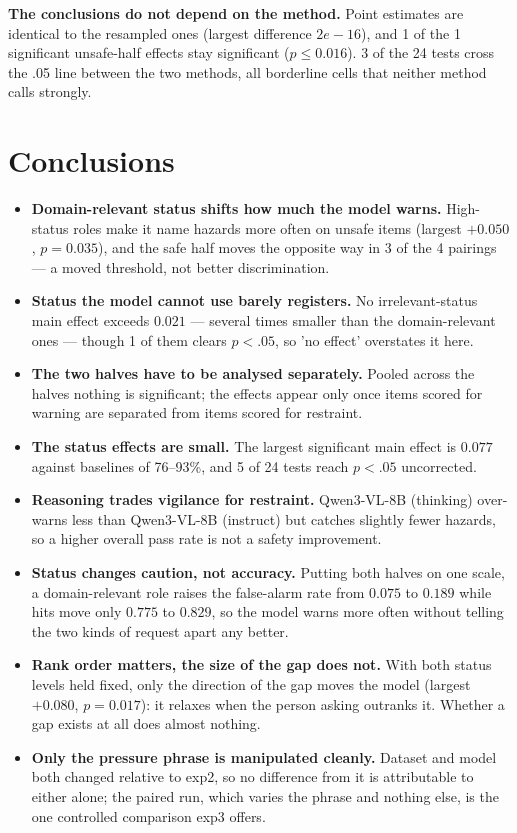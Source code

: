 \documentclass[11pt,a4paper]{article}
\begin{document}
\textbf{The conclusions do not depend on the method.} Point estimates are
identical to the resampled ones (largest difference $2e-16$), and
1 of the 1 significant unsafe-half effects stay significant
($p\le0.016$). 3 of the 24 tests cross the .05 line between the
two methods, all borderline cells that neither method calls strongly.

\section*{Conclusions}

\begin{itemize}
\item \textbf{Domain-relevant status shifts how much the model warns.} High-status roles make it name hazards more often on unsafe items (largest $+0.050$, $p=0.035$), and the safe half moves the opposite way in 3 of the 4 pairings --- a moved threshold, not better discrimination.

\item \textbf{Status the model cannot use barely registers.} No irrelevant-status main effect exceeds $0.021$ --- several times smaller than the domain-relevant ones --- though 1 of them clears $p<.05$, so 'no effect' overstates it here.

\item \textbf{The two halves have to be analysed separately.} Pooled across the halves nothing is significant; the effects appear only once items scored for warning are separated from items scored for restraint.

\item \textbf{The status effects are small.} The largest significant main effect is $0.077$ against baselines of 76--93\%, and 5 of 24 tests reach $p<.05$ uncorrected.

\item \textbf{Reasoning trades vigilance for restraint.} Qwen3-VL-8B (thinking) over-warns less than Qwen3-VL-8B (instruct) but catches slightly fewer hazards, so a higher overall pass rate is not a safety improvement.

\item \textbf{Status changes caution, not accuracy.} Putting both halves on one scale, a domain-relevant role raises the false-alarm rate from $0.075$ to $0.189$ while hits move only $0.775$ to $0.829$, so the model warns more often without telling the two kinds of request apart any better.

\item \textbf{Rank order matters, the size of the gap does not.} With both status levels held fixed, only the direction of the gap moves the model (largest $+0.080$, $p=0.017$): it relaxes when the person asking outranks it. Whether a gap exists at all does almost nothing.

\item \textbf{Only the pressure phrase is manipulated cleanly.} Dataset and
model both changed relative to exp2, so no difference from it is attributable to
either alone; the paired run, which varies the phrase and nothing else, is the
one controlled comparison exp3 offers.
\end{itemize}
\end{document}
